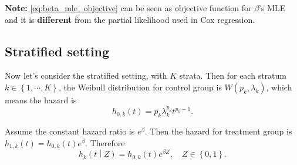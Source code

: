 \documentclass[a4paper,12pt]{article}
\begin{document}
\textbf{Note:} \eqref{eq:beta_mle_objective} can be seen as objective function for $\beta$'s MLE and it is \textbf{different} from the partial likelihood used in Cox regression.



\subsection{Stratified setting}
\label{sec:stratified-setting}

Now let's consider the stratified setting, with $K$ strata. Then for each stratum $k\in\left\{1, \cdots, K\right\}$, the Weibull distribution for control group is $W\left(p_k, \lambda_k\right)$, which means the hazard is
\[
  h_{0, k}\left(t\right) = p_k\lambda_k^{p_k}t^{p_k - 1}.
\]

Assume the constant hazard ratio is $e^\beta$. Then the hazard for treatment group is $h_{1, k}\left(t\right) = h_{0, k}\left(t\right)e^\beta$. Therefore
\[
  h_k\left(t\middle|Z\right) = h_{0, k}\left(t\right)e^{\beta Z},\quad Z\in\left\{0, 1\right\}. 
\]






\end{document}
